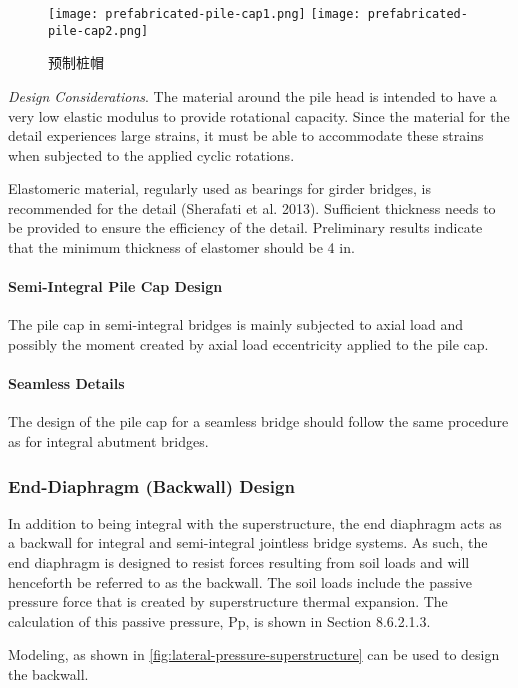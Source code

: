 \begin{figure}
  \texttt{[image: prefabricated-pile-cap1.png]}
  \texttt{[image: prefabricated-pile-cap2.png]}
  \caption{预制桩帽}
  \label{fig:prefabricated-pile-cap}
\end{figure}

\emph{Design Considerations}. The material around the pile head is intended to have a very low elastic modulus to provide rotational capacity. Since the material for the detail experiences large strains, it must be able to accommodate these strains when subjected to the applied cyclic rotations.

Elastomeric material, regularly used as bearings for girder bridges, is recommended for the detail (Sherafati et al. 2013). Sufficient thickness needs to be provided to ensure the efficiency of the detail. Preliminary results indicate that the minimum thickness of elastomer should be 4 in.

\paragraph{Semi-Integral Pile Cap Design}
The pile cap in semi-integral bridges is mainly subjected to axial load and possibly the moment created by axial load eccentricity applied to the pile cap.
\paragraph{Seamless Details}
The design of the pile cap for a seamless bridge should follow the same procedure as for integral abutment bridges.

\subsubsection{End-Diaphragm (Backwall) Design}

In addition to being integral with the superstructure, the end diaphragm acts as a backwall for integral and semi-integral jointless bridge systems. As such, the end diaphragm is designed to resist forces resulting from soil loads and will henceforth be referred to as the backwall. The soil loads include the passive pressure force that is created by superstructure thermal expansion. The calculation of this passive pressure, Pp, is shown in Section 8.6.2.1.3.

Modeling, as shown in \cref{fig:lateral-pressure-superstructure} can be used to design the backwall.


